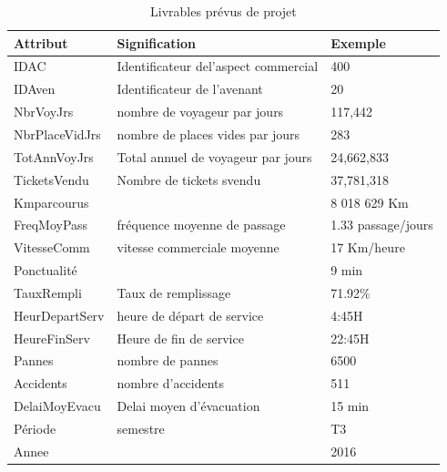 \documentclass[a4paper]{report}
\begin{document}
\begin{doublespace}
	\begin{table}[H]
		\begin{center}
			\begin{tabularx}{17.5cm}{|X|X|X|}
				\hline
				\textbf{Attribut} & \textbf{Signification}               &
				\textbf{Exemple}                                                        \\
				\hline
				IDAC              & Identificateur del'aspect commercial & 400          \\
				\hline
				IDAven            & Identificateur de l'avenant          & 20           \\
				\hline
				NbrVoyJrs         & nombre de voyageur par jours         & 117,442      \\
				\hline
				NbrPlaceVidJrs    & nombre de places vides par jours     &
				283                                                                     \\
				\hline
				TotAnnVoyJrs      & Total annuel de voyageur par jours   &
				24,662,833                                                              \\
				\hline
				TicketsVendu      & Nombre de tickets svendu             & 37,781,318   \\
				\hline
				Kmparcourus       &                                      & 8 018 629 Km \\
				\hline
				FreqMoyPass       & fréquence moyenne de passage         & 1.33
				passage/jours                                                           \\
				\hline
				VitesseComm       & vitesse commerciale moyenne          & 17
				Km/heure                                                                \\
				\hline
				Ponctualité       &                                      & 9 min        \\
				\hline
				TauxRempli        & Taux de remplissage                  & 71.92\%      \\
				\hline
				HeurDepartServ    & heure de départ de service           & 4:45H        \\
				\hline
				HeureFinServ      & Heure de fin de service              & 22:45H       \\
				\hline
				Pannes            & nombre de pannes                     & 6500         \\
				\hline
				Accidents         & nombre d'accidents                   & 511          \\
				\hline
				DelaiMoyEvacu     & Delai moyen d'évacuation             & 15 min       \\
				\hline
				Période           & semestre                             & T3           \\
				\hline
				Annee             &                                      & 2016         \\
				\hline
			\end{tabularx}
			\caption{Livrables prévus de projet}
		\end{center}
	\end{table}
	

\end{doublespace}
\end{document}
